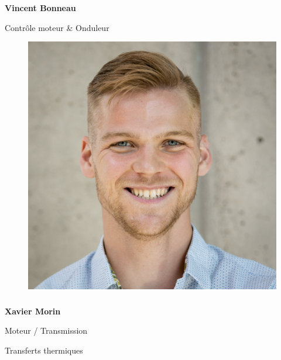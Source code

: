 \documentclass[a0paper,portrait]{baposter}
\begin{document}
\begin{poster}
{\subsubsection*{}
\vspace{2mm}
\textbf{Vincent Bonneau}

Contrôle moteur \& Onduleur


\begin{figure}
\includegraphics[width=.9\linewidth]{img/membres/Xavier-Morin-2.jpg} 
\end{figure}
\subsubsection*{}
\vspace{2mm}
\textbf{Xavier Morin}

Moteur / Transmission

Transferts thermiques


\vspace{1cm}
%
%
%
%
%
%
}



\end{poster}
\end{document}
